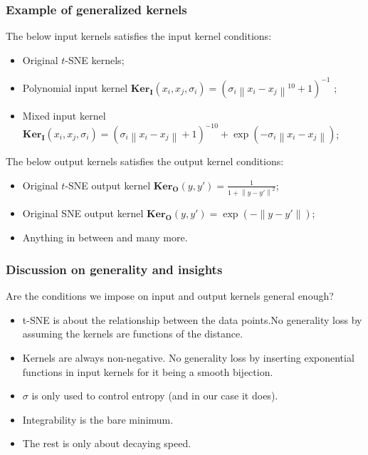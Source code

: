 \documentclass{beamer}
\newcommand{\ki}{\mathbf{Ker}_{\mathbf{I}}}
\newcommand{\ko}{\mathbf{Ker}_{\mathbf{O}}}
\newcommand\norm[1]{\left\lVert#1\right\rVert}
\begin{document}
\begin{frame}
  \frametitle{Example of generalized kernels}
  The below input kernels satisfies the input kernel conditions:
\begin{itemize}
      \item Original $t$-SNE kernels;
    \item Polynomial input kernel $\ki(x_i,x_j,\sigma_i) = (\sigma_i
              \norm{x_i-x_j}^{10}+1)^{-1}$ ;
    \item Mixed input kernel $\ki(x_i,x_j,\sigma_i) = (\sigma_i \norm{x_i-x_j}+1)^{-10} +
              \exp(-\sigma_i\norm{x_i-x_j})$;
\end{itemize}
The below output kernels satisfies the output kernel conditions:
\begin{itemize}
  \item Original $t$-SNE output kernel $\ko(y,y') = \frac{1}{1+\norm{y-y'}^2}$;
  \item Original SNE output kernel $\ko(y,y') = \exp(-\norm{y-y'})$;
  \item Anything in between and many more.
\end{itemize}
\end{frame}

\begin{frame}
  \frametitle{Discussion on generality and insights}
  Are the conditions we impose on input and output kernels general enough?

  \vspace{1em}
  \begin{itemize}
    \item [$\bullet$] t-SNE is about the relationship between the data points.No generality loss by assuming the kernels are functions of the distance.
    \item [$\bullet$] Kernels are always non-negative. No generality loss by inserting exponential functions in input kernels for it being a smooth bijection.
    \item [$\bullet$] $\sigma$ is only used to control entropy (and in our case it does).
    \item [$\bullet$] Integrability is the bare minimum.
    \item [$\bullet$] The rest is only about decaying speed.
  \end{itemize}
\end{frame}
\end{document}
